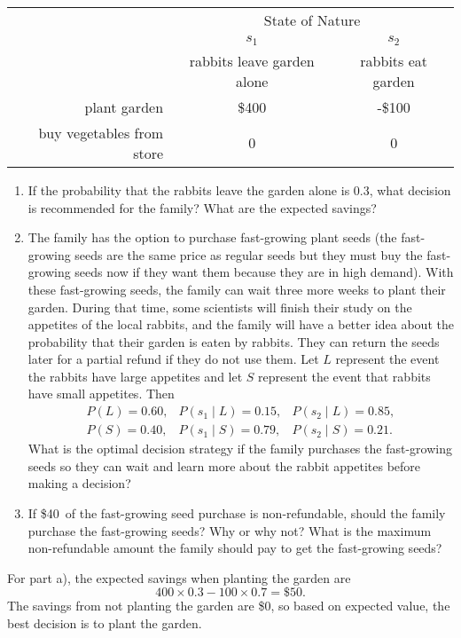 \begin{enumerate}
\begin{tabular}{rcc}
& \multicolumn{2}{c}{State of Nature} \\
& $s_1$ & $s_2$ \\
& rabbits leave garden alone & rabbits eat garden \\ \cline{2-3}
plant garden & \$400 & -\$100\\
buy vegetables from store & 0 & 0
\end{tabular}

\begin{enumerate}
    \item If the probability that the rabbits leave the garden alone is 0.3, what decision is recommended for the family? What are the expected savings?
    
    \item The family has the option to purchase fast-growing plant seeds (the fast-growing seeds are the same price as regular seeds but they must buy the fast-growing seeds now if they want them because they are in high demand).  With these fast-growing seeds, the family can wait three more weeks to plant their garden. During that time, some scientists will finish their study on the appetites of the local rabbits, and the family will have a better idea about the probability that their garden is eaten by rabbits. They can return the seeds later for a partial refund if they do not use them.
    Let $L$ represent the event the rabbits have large appetites and let $S$ represent
    the event that rabbits have small appetites. Then
    \[
    \begin{matrix}
    P(L)=0.60, & P(s_1 \mid L)=0.15, & P(s_2 \mid L)=0.85,\\
    P(S)=0.40, & P(s_1 \mid S)=0.79, & P(s_2 \mid S)=0.21.
    \end{matrix}
    \]
    What is the optimal decision strategy if the family purchases the fast-growing seeds so they can wait and learn more about the rabbit appetites before making a decision?
    
    \item If \$40\ of the fast-growing seed purchase is non-refundable, should the family purchase the fast-growing seeds? Why or why not? What is the maximum non-refundable amount the family should pay to get the fast-growing seeds?
\end{enumerate}

\begin{solution}
\bs For part a), the expected savings when planting the garden are
\[ 400 \times 0.3  - 100 \times 0.7 = \$50. \]
The savings from not planting the garden are \$0, so based on expected value,
the best decision is to plant the garden.


\end{solution}
\end{enumerate}
